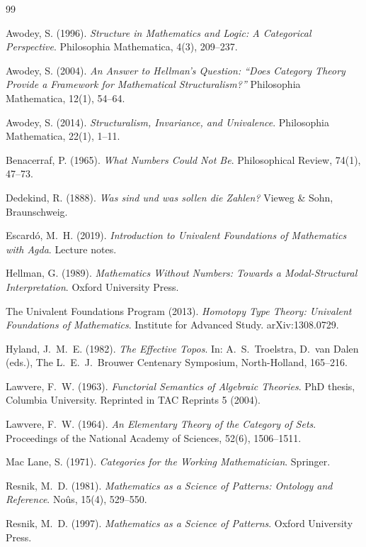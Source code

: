 \documentclass[12pt]{article}
\theoremstyle{definition}
\theoremstyle{remark}
\begin{document}
\begin{thebibliography}{99}

Awodey, S. (1996). \emph{Structure in Mathematics and Logic: A Categorical Perspective}. Philosophia Mathematica, 4(3), 209--237.

Awodey, S. (2004). \emph{An Answer to Hellman's Question: ``Does Category Theory Provide a Framework for Mathematical Structuralism?''} Philosophia Mathematica, 12(1), 54--64.

Awodey, S. (2014). \emph{Structuralism, Invariance, and Univalence}. Philosophia Mathematica, 22(1), 1--11.

Benacerraf, P. (1965). \emph{What Numbers Could Not Be}. Philosophical Review, 74(1), 47--73.

Dedekind, R. (1888). \emph{Was sind und was sollen die Zahlen?} Vieweg \& Sohn, Braunschweig.

Escard\'o, M.\ H. (2019). \emph{Introduction to Univalent Foundations of Mathematics with Agda}. Lecture notes.

Hellman, G. (1989). \emph{Mathematics Without Numbers: Towards a Modal-Structural Interpretation}. Oxford University Press.

The Univalent Foundations Program (2013). \emph{Homotopy Type Theory: Univalent Foundations of Mathematics}. Institute for Advanced Study. arXiv:1308.0729.

Hyland, J.\ M.\ E. (1982). \emph{The Effective Topos}. In: A.\ S.\ Troelstra, D.\ van Dalen (eds.), The L.\ E.\ J.\ Brouwer Centenary Symposium, North-Holland, 165--216.

Lawvere, F.\ W. (1963). \emph{Functorial Semantics of Algebraic Theories}. PhD thesis, Columbia University. Reprinted in TAC Reprints 5 (2004).

Lawvere, F.\ W. (1964). \emph{An Elementary Theory of the Category of Sets}. Proceedings of the National Academy of Sciences, 52(6), 1506--1511.

Mac Lane, S. (1971). \emph{Categories for the Working Mathematician}. Springer.

Resnik, M.\ D. (1981). \emph{Mathematics as a Science of Patterns: Ontology and Reference}. No\^us, 15(4), 529--550.

Resnik, M.\ D. (1997). \emph{Mathematics as a Science of Patterns}. Oxford University Press.


\end{thebibliography}
\end{document}
